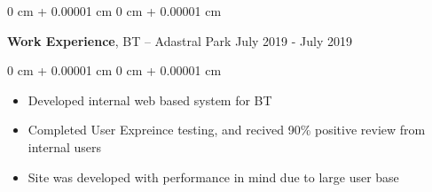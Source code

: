 \documentclass[10pt, letterpaper]{article}
\newenvironment{highlights}{
    \begin{itemize}[
        topsep=0.10 cm,
        parsep=0.10 cm,
        partopsep=0pt,
        itemsep=0pt,
        leftmargin=0 cm + 10pt
    ]
}{
    \end{itemize}
} %
\newenvironment{onecolentry}{
    \begin{adjustwidth}{
        0 cm + 0.00001 cm
    }{
        0 cm + 0.00001 cm
    }
}{
    \end{adjustwidth}
} %
\newenvironment{twocolentry}[2][]{
    \onecolentry
    \def\secondColumn{#2}
    \setcolumnwidth{\fill, 4.5 cm}
    \begin{paracol}{2}
}{
    \switchcolumn \raggedleft \secondColumn
    \end{paracol}
    \endonecolentry
} %
\begin{document}
    \vspace{0.2 cm}
    \begin{twocolentry}{
        July 2019 - July 2019
    }
        \textbf{Work Experience}, BT -- Adastral Park\end{twocolentry}
    \begin{onecolentry}
        \begin{highlights}
            \item Developed internal web based system for BT
            \item Completed User Expreince testing, and recived 90\% positive review from internal users
            \item Site was developed with performance in mind due to large user base
        \end{highlights}
    \end{onecolentry}
\end{document}
